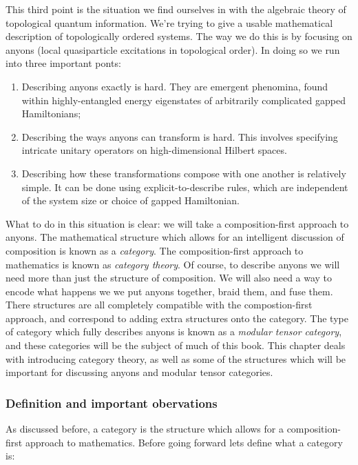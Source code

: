 This third point is the situation we find ourselves in with the algebraic theory of topological quantum information. We're trying to give a usable mathematical description of topologically ordered systems. The way we do this is by focusing on anyons (local quasiparticle excitations in topological order). In doing so we run into three important ponts:

\begin{enumerate}
\item Describing anyons exactly is hard. They are emergent phenomina, found within highly-entangled energy eigenstates of arbitrarily complicated gapped Hamiltonians;
\item Describing the ways anyons can transform is hard. This involves specifying intricate unitary operators on high-dimensional Hilbert spaces.
\item Describing how these transformations compose with one another is relatively simple. It can be done using explicit-to-describe rules, which are independent of the system size or choice of gapped Hamiltonian.
\end{enumerate}

What to do in this situation is clear: we will take a composition-first approach to anyons. The mathematical structure which allows for an intelligent discussion of composition is known as a {\em category}. The composition-first approach to mathematics is known as {\em category theory}. Of course, to describe anyons we will need more than just the structure of composition. We will also need a way to encode what happens we we put anyons together, braid them, and fuse them. There structures are all completely compatible with the compostion-first approach, and correspond to adding extra structures onto the category. The type of category which fully describes anyons is known as a {\em modular tensor category}, and these categories will be the subject of much of this book. This chapter deals with introducing category theory, as well as some of the structures which will be important for discussing anyons and modular tensor categories.

\subsubsection{Definition and important obervations}

As discussed before, a category is the structure which allows for a composition-first approach to mathematics. Before going forward lets define what a category is:


